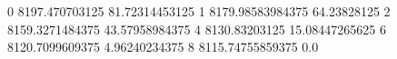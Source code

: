 0 8197.470703125 81.72314453125
1 8179.98583984375 64.23828125
2 8159.3271484375 43.57958984375
4 8130.83203125 15.08447265625
6 8120.7099609375 4.96240234375
8 8115.74755859375 0.0
